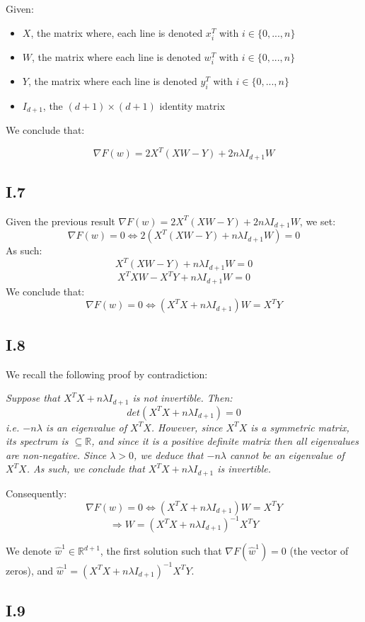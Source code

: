 \documentclass{homework}
\begin{document}
Given:
\begin{itemize}
    \item $X$, the matrix where, each line is denoted $x_i^T$ with $i\in\{0,...,n\}$
    \item $W$, the matrix where each line is denoted $w_i^T$ with $i\in\{0,...,n\}$
    \item $Y$, the matrix where each line is denoted $y_i^T$ with $i\in\{0,...,n\}$
    \item $I_{d+1}$, the $(d+1)\times(d+1)$ identity matrix
\end{itemize}
We conclude that:

\textcolor{OliveGreen}{$$\nabla F(w)=2X^T(XW-Y)+2n\lambda I_{d+1}W$$}

\subsection*{I.7}

Given the previous result $\nabla F(w)=2X^T(XW-Y)+2n\lambda I_{d+1}W$, we set:
$$\nabla F(w) = 0 \Leftrightarrow 2(X^T(XW-Y)+n\lambda I_{d+1}W)=0$$
As such:
$$X^T(XW-Y)+n\lambda I_{d+1}W=0$$
$$X^TXW-X^TY+n\lambda I_{d+1}W=0$$
We conclude that:
\textcolor{OliveGreen}{$$\nabla F(w) = 0 \Leftrightarrow (X^TX+n\lambda I_{d+1})W=X^TY$$}

\subsection*{I.8}

We recall the following proof by contradiction:

\textit{Suppose that $X^TX+n\lambda I_{d+1}$ is not invertible. Then:
$$det(X^TX+n\lambda I_{d+1})=0$$
i.e. $-n\lambda$ is an eigenvalue of $X^TX$. However, since $X^TX$ is a symmetric matrix, its
spectrum is $\subseteq \mathbb{R}$, and since it is a positive definite matrix then all eigenvalues are
non-negative. Since $\lambda>0$, we deduce that $-n\lambda$ cannot be an eigenvalue of $X^TX$. As such, we
conclude that $X^TX+n\lambda I_{d+1}$ is invertible.}

Consequently:
$$\nabla F(w) = 0 \Leftrightarrow (X^TX+n\lambda I_{d+1})W=X^TY$$
$$\Rightarrow W=(X^TX+n\lambda I_{d+1})^{-1}X^TY$$

\textcolor{OliveGreen}{We denote $\hat{w}^1\in\mathbb{R}^{d+1}$, the first solution such that $\nabla F(\hat{w}^1)=0$ 
(the vector of zeros), and $\hat{w}^1=(X^TX+n\lambda I_{d+1})^{-1}X^TY$.}

\subsection*{I.9}
\end{document}

